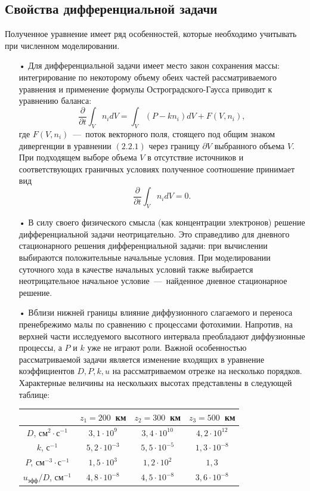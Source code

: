 \documentclass[14pt, a4paper, fleqn]{extarticle}
\begin{document}
\subsection{Свойства дифференциальной задачи}

Полученное уравнение имеет ряд особенностей, которые необходимо учитывать при численном 
моделировании.

\begin{itemize}
\item[•] Для дифференциальной задачи имеет место закон сохранения массы: интегрирование по некоторому объему обеих частей рассматриваемого уравнения и применение формулы Остроградского-Гаусса приводит к уравнению баланса: $$\dfrac{\partial}{\partial t}\int_V n_i dV = \int_V (P-k n_i) dV + F(V, n_i),$$ где $F(V, n_i)$~---~поток векторного поля, стоящего под общим знаком дивергенции в уравнении $(2.2.1)$ через границу $\partial V$ выбранного объема $V$. При подходящем выборе объема $V$ в отсутствие источников и соответствующих граничных условиях полученное соотношение принимает вид $$\dfrac{\partial}{\partial t}\int_V n_i dV = 0.$$

\item[•] В силу своего физического смысла (как концентрации электронов) решение дифференциальной задачи неотрицательно. Это справедливо для дневного стационарного решения дифференциальной задачи: при вычислении выбираются положительные начальные условия. При моделировании суточного хода в качестве начальных условий также выбирается неотрицательное начальное условие~---~найденное дневное стационарное решение.
 
\item[•] Вблизи нижней границы влияние диффузионного слагаемого и переноса пренебрежимо малы по сравнению с процессами фотохимии. Напротив, на верхней части исследуемого высотного интервала преобладают диффузионные процессы, а $P$ и $k$ уже не играют роли. Важной особенностью рассматриваемой задачи является изменение входящих в уравнение коэффициентов $D, P, k, u$ на рассматриваемом отрезке на несколько порядков. Характерные величины на нескольких высотах представлены в следующей таблице: 

\smallskip

\begin{tabular}{|c|c|c|c|}
\hline
&$z_1=200$~км&$z_2=300$~км&$z_3=500$~км\\
\hline
$D$, см$^{2}\cdot$с$^{-1}$&$3{,}1\cdot 10^9$&$3{,}4\cdot 10^{10}$&$4{,}2\cdot 10^{12}$\\
\hline
$k$, с$^{-1}$&$5{,}2\cdot 10^{-3}$&$5{,}5\cdot 10^{-5}$&$1{,}3\cdot 10^{-8}$\\
\hline
$P$, см$^{-3}\cdot$с$^{-1}$&$1{,}5\cdot 10^3$&$1{,}2\cdot 10^{2}$&$1{,}3$\\
\hline
$u_\textrm{эфф}/D$, см$^{-1}$&$4{,}8\cdot 10^{-8}$&$4{,}5\cdot 10^{-8}$&$3{,}6\cdot 10^{-8}$\\
\hline
\end{tabular}


\end{itemize}
\end{document}
